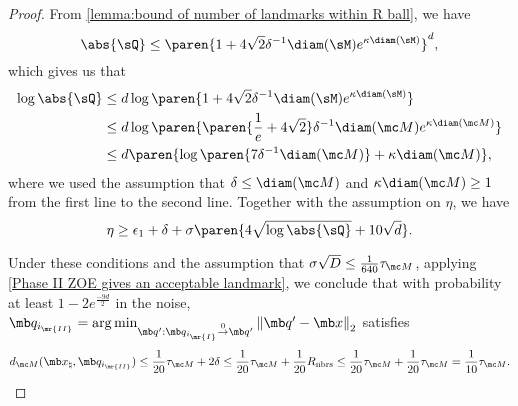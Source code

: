 \begin{proof}
From \cref{lemma:bound of number of landmarks within R ball}, we have
\begin{equation}
    \abs{\sQ} \le \paren{1 + 4\sqrt{2}\delta^{-1} \diam(\sM) e^{\kappa \diam(\sM)} }^d,
\end{equation}
which gives us that
\begin{equation}
    \begin{aligned}
    \log \abs{\sQ} 
    &\leq d \log \paren{1 + 4\sqrt{2}\delta^{-1} \diam(\sM) e^{\kappa \diam(\sM)}}\\
    &\leq d \log \paren{\paren{\frac{1}{e}+4 \sqrt{2}}\delta^{-1}\diam(\mc M)e^{\kappa \diam(\mc M)}}\\
    &\leq d \paren{\log \paren{ 7 \delta^{-1} \diam(\mc M)} + \kappa \diam(\mc M)},
    \end{aligned}
\end{equation}
where we used the assumption that $\delta \leq \diam(\mc M)$ and $\kappa \diam(\mc M) \geq 1$ from the first line to the second line. Together with the assumption on $\eta$, we have
\begin{equation}
    \eta \geq \epsilon_1 + \delta + \sigma \paren{4 \sqrt{\log \abs{\sQ}} + 10\sqrt{d}}.
\end{equation}


Under these conditions and the assumption that {$\sigma\sqrt{D} \leq \frac{1}{640} \tau_{\mc M} $}, applying \cref{Phase II ZOE gives an acceptable landmark}, we conclude that with probability at least {$1 - 2e^{\frac{-9d}{2}}$} in the noise,  $\mb q_{i_{\mr{II}}} = \arg\min_{\mb q': \mb q_{i_{\mr{I}}} \overset{0}{\rightarrow} \mb q'}\left\|\mb q' -\mb x\right\|_2$ satisfies 
\begin{equation}
    d_{\mc M}(\mb x_\natural, \mb q_{i_{\mr{II}}}) \le \frac{1}{20}\tau_{\mc M}+2\delta \leq \frac{1}{20}\tau_{\mc M}+\frac{1}{20}R_{\text{nbrs}} \le \frac{1}{20}\tau_{\mc M}+\frac{1}{20}\tau_{\mc M} = \frac{1}{10}\tau_{\mc M}.
\end{equation} 
\end{proof}


